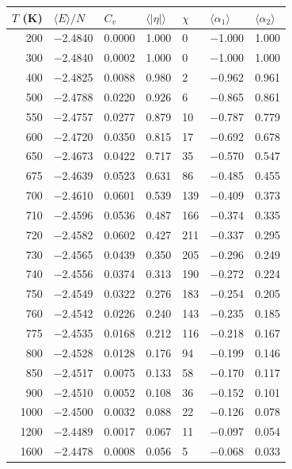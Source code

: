 \begin{tabular}{rllllll}
\toprule
$T$ (K) & $\langle E\rangle/N$ & $C_v$ & $\langle|\eta|\rangle$ & $\chi$ & $\langle\alpha_1\rangle$ & $\langle\alpha_2\rangle$ \\
\midrule
200 & $-$2.4840 & 0.0000 & 1.000 & 0 & $-$1.000 & 1.000 \\
300 & $-$2.4840 & 0.0002 & 1.000 & 0 & $-$1.000 & 1.000 \\
400 & $-$2.4825 & 0.0088 & 0.980 & 2 & $-$0.962 & 0.961 \\
500 & $-$2.4788 & 0.0220 & 0.926 & 6 & $-$0.865 & 0.861 \\
550 & $-$2.4757 & 0.0277 & 0.879 & 10 & $-$0.787 & 0.779 \\
600 & $-$2.4720 & 0.0350 & 0.815 & 17 & $-$0.692 & 0.678 \\
650 & $-$2.4673 & 0.0422 & 0.717 & 35 & $-$0.570 & 0.547 \\
675 & $-$2.4639 & 0.0523 & 0.631 & 86 & $-$0.485 & 0.455 \\
700 & $-$2.4610 & 0.0601 & 0.539 & 139 & $-$0.409 & 0.373 \\
710 & $-$2.4596 & 0.0536 & 0.487 & 166 & $-$0.374 & 0.335 \\
720 & $-$2.4582 & 0.0602 & 0.427 & 211 & $-$0.337 & 0.295 \\
730 & $-$2.4565 & 0.0439 & 0.350 & 205 & $-$0.296 & 0.249 \\
740 & $-$2.4556 & 0.0374 & 0.313 & 190 & $-$0.272 & 0.224 \\
750 & $-$2.4549 & 0.0322 & 0.276 & 183 & $-$0.254 & 0.205 \\
760 & $-$2.4542 & 0.0226 & 0.240 & 143 & $-$0.235 & 0.185 \\
775 & $-$2.4535 & 0.0168 & 0.212 & 116 & $-$0.218 & 0.167 \\
800 & $-$2.4528 & 0.0128 & 0.176 & 94 & $-$0.199 & 0.146 \\
850 & $-$2.4517 & 0.0075 & 0.133 & 58 & $-$0.170 & 0.117 \\
900 & $-$2.4510 & 0.0052 & 0.108 & 36 & $-$0.152 & 0.101 \\
1000 & $-$2.4500 & 0.0032 & 0.088 & 22 & $-$0.126 & 0.078 \\
1200 & $-$2.4489 & 0.0017 & 0.067 & 11 & $-$0.097 & 0.054 \\
1600 & $-$2.4478 & 0.0008 & 0.056 & 5 & $-$0.068 & 0.033 \\
\bottomrule
\end{tabular}
